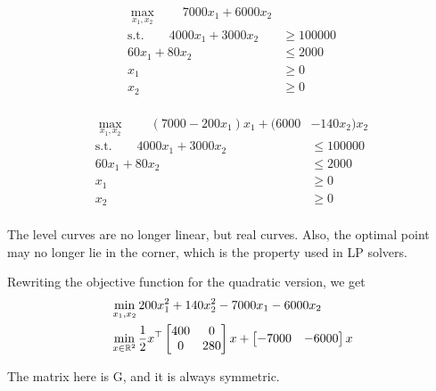 \documentclass{article}
\begin{document}
\begin{minipage}[c]{0.5\textwidth}
  \begin{align*}
    \max_{x_1, x_2} \qquad 7000 x_1 + 6000x_2 &             \\
    \text{s.t.} \qquad 4000x_1 + 3000x_2      & \geq 100000 \\
    60x_1 + 80x_2                             & \leq 2000   \\
    x_1                                       & \geq 0      \\
    x_2                                       & \geq 0      \\
  \end{align*}
  \begin{center}
  \end{center}
\end{minipage}
\begin{minipage}[c]{0.5\textwidth}
  \begin{align*}
    \max_{x_1, x_2} \qquad (7000-200x_1)x_1 + (6000 & - 140x_2)x_2 \\
    \text{s.t.} \qquad 4000x_1 + 3000x_2            & \leq 100000  \\
    60x_1 + 80x_2                                   & \leq 2000    \\
    x_1                                             & \geq 0       \\
    x_2                                             & \geq 0       \\
  \end{align*}
  \begin{center}
  \end{center}
\end{minipage}

\medskip
The level curves are no longer linear, but real curves. Also, the optimal point may no longer lie in the corner, which is the property used in LP solvers. 

\medskip Rewriting the objective function for the quadratic version, we get
\begin{align*}
  &\min_{x_1, x_2} 200x_1^2 + 140x_2^2 - 7000x_1 - 6000x_2 \\
  &\min_{x\in \mathbb{R}^{2}} \frac{1}{2}x^{\top}\begin{bmatrix} 400 & 0 \\ 0 & 280 \end{bmatrix}x + \begin{bmatrix} -7000 & -6000 \end{bmatrix}x
\end{align*}

The matrix here is G, and it is always symmetric. 
\end{document}
